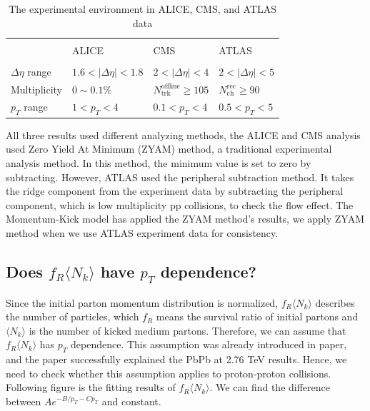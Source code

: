 \documentclass[jkps,fleqn,showpacs,showkeys]{revtex4}
\begin{document}
\begin{table}[ht]
  \centering
  \begin{tabular}{C{3cm} | C{3cm}  C{3cm}  C{3cm} } 
  \hline \\[-1 ex]
   & ALICE\cite{alice} & CMS\cite{cms} & ATLAS\cite{atlas} \\ [1 ex] \hline\hline \\[-1.5ex]
  $\Delta \eta $ range & $1.6<|\Delta \eta |<1.8$ & $2<|\Delta \eta |<4$ & $2<|\Delta \eta |<5$ \\ [1ex] 
  Multiplicity & $0\sim0.1\%$ & $N_{\text{trk}}^{\text{offline}} \geq 105$ & $N_{\text{ch}}^{\text{rec}} \geq 90$ \\[1ex] 
  $p_T$ range & $1<p_T<4$ & $0.1<p_T<4$ & $0.5<p_T<5$ \\[1 ex]
  \hline
 \end{tabular}
 \caption{The experimental environment in ALICE, CMS, and ATLAS data \cite{alice, cms, atlas}}
 \label{table:range}
\end{table}

All three results used different analyzing methods, the ALICE and CMS analysis used Zero Yield At Minimum (ZYAM) method, a traditional experimental analysis method.
In this method, the minimum value is set to zero by subtracting.
However, ATLAS used the peripheral subtraction method.
It takes the ridge component from the experiment data by subtracting the peripheral component, which is low multiplicity pp collisions, to check the flow effect.
The Momentum-Kick model has applied the ZYAM method's results, we apply ZYAM method when we use ATLAS experiment data for consistency.

\subsection{Does $f_R\langle N_k \rangle$ have $p_T$ dependence?}
\label{subsec: pT depnedence}

Since the initial parton momentum distribution is normalized, $f_R\langle N_k \rangle$ describes the number of particles, which $f_R$ means the survival ratio of initial partons and $\langle N_k \rangle$ is the number of kicked medium partons.
Therefore, we can assume that $f_R\langle N_k \rangle$ has $p_T$ dependence.
This assumption was already introduced in paper\cite{PbPb}, and the paper successfully explained the PbPb at 2.76 TeV results.
Hence, we need to check whether this assumption applies to proton-proton collisions.
Following figure is the fitting results of $f_R\langle N_k \rangle$.
We can find the difference between $Ae^{-{B} / p_T -C p_{T}}$ and constant.
\end{document}
